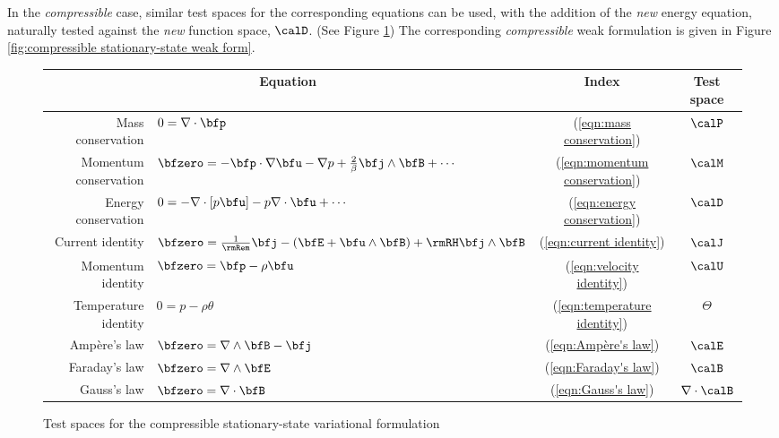 
    In the \emph{compressible} case, similar test spaces for the corresponding equations can be used, with the addition of the \emph{new} energy equation, naturally tested against the \emph{new} function space, $\calD$. (See Figure \ref{fig:compressible stationary-state test spaces}) The corresponding \emph{compressible} weak formulation is given in Figure \ref{fig:compressible stationary-state weak form}.

    \begin{figure}
        \centering
        \begin{tabular}{ r l c | c }
            \multicolumn{2}{c}{Equation}  &  Index  &  Test space  \\
            \hline\hline
            Mass conservation  &  $0  =  \nabla\cdot\bfp$  &  (\ref{eqn:mass conservation})  &  $\calP$  \\
            Momentum conservation  &  $\bfzero 
             =  - \bfp\cdot\nabla\bfu - \nabla p + \frac{2}{\beta}\bfj\wedge\bfB + \cdots$  &  (\ref{eqn:momentum conservation})  &  $\calM$  \\
            Energy conservation  &  $0  =  - \nabla\cdot[p\bfu] - p\nabla\cdot\bfu + \cdots$  &  (\ref{eqn:energy conservation})  &  $\calD$  \\
            \hline
            Current identity  &  $\bfzero  =  \frac{1}{\rmRem}\bfj - \left(\bfE + \bfu\wedge\bfB\right) + \rmRH\bfj\wedge\bfB$  &  (\ref{eqn:current identity})  &  $\calJ$  \\
            \hline
            Momentum identity  &  $\bfzero  =  \bfp - \rho\bfu$  &  (\ref{eqn:velocity identity})  &  $\calU$  \\
            Temperature identity  &  $0  =  p - \rho\theta$  &  (\ref{eqn:temperature identity})  &  $\Theta$  \\
            \hline
            Ampère's law  &  $\bfzero  =  \nabla\wedge\bfB - \bfj$  &  (\ref{eqn:Ampère's law})  &  $\calE$  \\
            Faraday's law  &  $\bfzero  =  \nabla\wedge\bfE$  &  (\ref{eqn:Faraday's law})  &  $\calB$  \\
            Gauss's law  &  $\bfzero  =  \nabla\cdot\bfB$  &  (\ref{eqn:Gauss's law})  &  $\nabla\cdot\calB$  \\
        \end{tabular}
        \caption{Test spaces for the compressible stationary-state variational formulation}
        \label{fig:compressible stationary-state test spaces}
    \end{figure}

